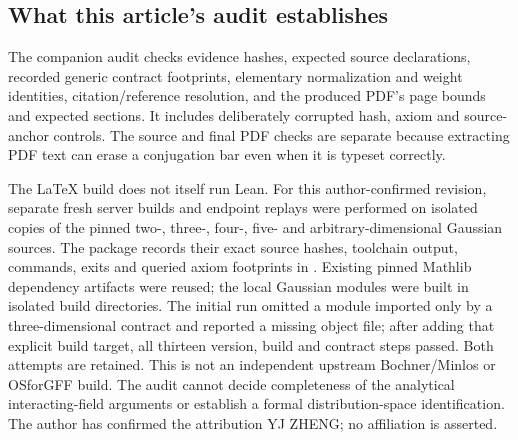 \documentclass[11pt]{amsart}
\theoremstyle{remark}\newtheorem{remark}[theorem]{Remark}
\begin{document}
\subsection{What this article's audit establishes}
The companion audit checks evidence hashes, expected source declarations, recorded generic contract footprints, elementary normalization and weight identities, citation/reference resolution, and the produced PDF's page bounds and expected sections. It includes deliberately corrupted hash, axiom and source-anchor controls. The source and final PDF checks are separate because extracting PDF text can erase a conjugation bar even when it is typeset correctly.

The LaTeX build does not itself run Lean. For this author-confirmed revision, separate fresh server builds and endpoint replays were performed on isolated copies of the pinned two-, three-, four-, five- and arbitrary-dimensional Gaussian sources. The package records their exact source hashes, toolchain output, commands, exits and queried axiom footprints in . Existing pinned Mathlib dependency artifacts were reused; the local Gaussian modules were built in isolated build directories. The initial run omitted a module imported only by a three-dimensional contract and reported a missing object file; after adding that explicit build target, all thirteen version, build and contract steps passed. Both attempts are retained. This is not an independent upstream Bochner/Minlos or OSforGFF build. The audit cannot decide completeness of the analytical interacting-field arguments or establish a formal distribution-space identification. The author has confirmed the attribution YJ ZHENG; no affiliation is asserted.
\end{document}
